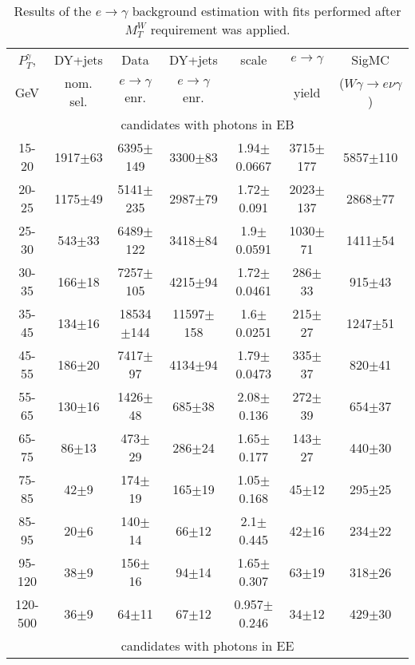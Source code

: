 \begin{table}[h]
  \scriptsize
  \begin{center}
  \caption{Results of the $e\rightarrow\gamma$ background estimation with fits performed after $M_T^W$ requirement was applied.} 
   \begin{tabular}{|c|c|c|c|c|c|c|}
\hline
 $P_T^{\gamma}$,  & DY+jets    & Data                      & DY+jets & scale & $e\rightarrow\gamma$ & SigMC\\ 
 GeV            & nom. sel. & $e\rightarrow\gamma$ enr. & $e\rightarrow\gamma$ enr. & & yield & ($W\gamma\rightarrow e\nu\gamma$)\\ \hline
 \multicolumn{7}{|c|}{candidates with photons in EB}\\ 
15-20 & 1917$\pm$63 & 6395$\pm$149 & 3300$\pm$83 & 1.94$\pm$0.0667& 3715$\pm$177& 5857$\pm$110 \\ \hline
20-25 & 1175$\pm$49 & 5141$\pm$235 & 2987$\pm$79 & 1.72$\pm$0.091& 2023$\pm$137& 2868$\pm$77 \\ \hline
25-30 & 543$\pm$33 & 6489$\pm$122 & 3418$\pm$84 & 1.9$\pm$0.0591& 1030$\pm$71& 1411$\pm$54 \\ \hline
30-35 & 166$\pm$18 & 7257$\pm$105 & 4215$\pm$94 & 1.72$\pm$0.0461& 286$\pm$33& 915$\pm$43 \\ \hline
35-45 & 134$\pm$16 & 18534$\pm$144 & 11597$\pm$158 & 1.6$\pm$0.0251& 215$\pm$27& 1247$\pm$51 \\ \hline
45-55 & 186$\pm$20 & 7417$\pm$97 & 4134$\pm$94 & 1.79$\pm$0.0473& 335$\pm$37& 820$\pm$41 \\ \hline
55-65 & 130$\pm$16 & 1426$\pm$48 & 685$\pm$38 & 2.08$\pm$0.136& 272$\pm$39& 654$\pm$37 \\ \hline
65-75 & 86$\pm$13 & 473$\pm$29 & 286$\pm$24 & 1.65$\pm$0.177& 143$\pm$27& 440$\pm$30 \\ \hline
75-85 & 42$\pm$9 & 174$\pm$19 & 165$\pm$19 & 1.05$\pm$0.168& 45$\pm$12& 295$\pm$25 \\ \hline
85-95 & 20$\pm$6 & 140$\pm$14 & 66$\pm$12 & 2.1$\pm$0.445& 42$\pm$16& 234$\pm$22 \\ \hline
95-120 & 38$\pm$9 & 156$\pm$16 & 94$\pm$14 & 1.65$\pm$0.307& 63$\pm$19& 318$\pm$26 \\ \hline
120-500 & 36$\pm$9 & 64$\pm$11 & 67$\pm$12 & 0.957$\pm$0.246& 34$\pm$12& 429$\pm$30 \\ \hline
\multicolumn{7}{|c|}{candidates with photons in EE}\\ 

\end{tabular}
\end{center}
\end{table}
